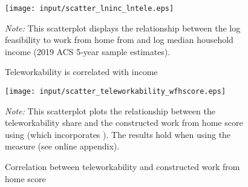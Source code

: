 \begin{figure}[hbt!]
  \caption{Teleworkability is correlated with income}
    \centering
    \texttt{[image: input/scatter\_lninc\_lntele.eps]}
    \begin{minipage}{\textwidth}
    \footnotesize \textit{Note:} This scatterplot displays the relationship between the log feasibility to work from home from \cite{dingel} and log median household income (2019 ACS 5-year sample estimates).
    \end{minipage}
\end{figure}

\begin{figure}[hbt!]
  \caption{Correlation between teleworkability and constructed work from home score}
  \label{fig:scatter_wfh}
    \centering
    \texttt{[image: input/scatter\_teleworkability\_wfhscore.eps]}
    \begin{minipage}{\textwidth}
        \footnotesize \textit{Note:} This scatterplot plots the relationship between the \cite{dingel} teleworkability share and the constructed work from home score using \cite{mongey} (which incorporates \cite{dingel}). The results hold when using the \cite{mongey} measure (see online appendix).
    \end{minipage}
\end{figure}
\clearpage


